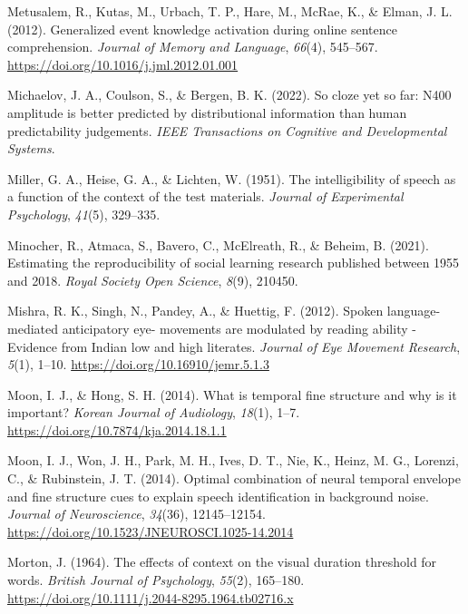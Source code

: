 \documentclass[a4paper, nobind]{templates/ociamthesis}
\newlength{\cslhangindent}
\newenvironment{CSLReferences}[2] %
 {%
  \setlength{\parindent}{0pt}
  \ifodd #1
  \let\oldpar\par
  \def\par{\hangindent=\cslhangindent\oldpar}
  \fi
  \setlength{\parskip}{1mm}
  \setlength{\baselineskip}{6mm}
 }%
 {}
\begin{document}
\begin{CSLReferences}{1}{0}
\leavevmode{}%
Metusalem, R., Kutas, M., Urbach, T. P., Hare, M., McRae, K., \& Elman, J. L. (2012). Generalized event knowledge activation during online sentence comprehension. \emph{Journal of Memory and Language}, \emph{66}(4), 545--567. \url{https://doi.org/10.1016/j.jml.2012.01.001}

\leavevmode{}%
Michaelov, J. A., Coulson, S., \& Bergen, B. K. (2022). So cloze yet so far: N400 amplitude is better predicted by distributional information than human predictability judgements. \emph{IEEE Transactions on Cognitive and Developmental Systems}.

\leavevmode{}%
Miller, G. A., Heise, G. A., \& Lichten, W. (1951). {The intelligibility of speech as a function of the context of the test materials}. \emph{Journal of Experimental Psychology}, \emph{41}(5), 329--335.

\leavevmode{}%
Minocher, R., Atmaca, S., Bavero, C., McElreath, R., \& Beheim, B. (2021). Estimating the reproducibility of social learning research published between 1955 and 2018. \emph{Royal Society Open Science}, \emph{8}(9), 210450.

\leavevmode{}%
Mishra, R. K., Singh, N., Pandey, A., \& Huettig, F. (2012). {Spoken language-mediated anticipatory eye- movements are modulated by reading ability - Evidence from Indian low and high literates}. \emph{Journal of Eye Movement Research}, \emph{5}(1), 1--10. \url{https://doi.org/10.16910/jemr.5.1.3}

\leavevmode{}%
Moon, I. J., \& Hong, S. H. (2014). What is temporal fine structure and why is it important? \emph{Korean Journal of Audiology}, \emph{18}(1), 1--7. \url{https://doi.org/10.7874/kja.2014.18.1.1}

\leavevmode{}%
Moon, I. J., Won, J. H., Park, M. H., Ives, D. T., Nie, K., Heinz, M. G., Lorenzi, C., \& Rubinstein, J. T. (2014). Optimal combination of neural temporal envelope and fine structure cues to explain speech identification in background noise. \emph{Journal of Neuroscience}, \emph{34}(36), 12145--12154. \url{https://doi.org/10.1523/JNEUROSCI.1025-14.2014}

\leavevmode{}%
Morton, J. (1964). {The effects of context on the visual duration threshold for words}. \emph{British Journal of Psychology}, \emph{55}(2), 165--180. \url{https://doi.org/10.1111/j.2044-8295.1964.tb02716.x}


\end{CSLReferences}
\end{document}
